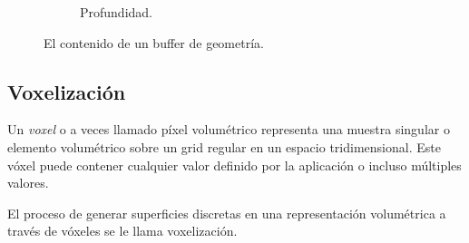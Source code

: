\begin{figure}[H]
\begin{subfigure}[t]{0.32\textwidth}
		\caption*{Profundidad.}
	\end{subfigure}%
	\caption{El contenido de un buffer de geometría.}
	\label{fig:gbuffer}
\end{figure}

\subsection{Voxelización}
\label{sec:voxelization}
Un \emph{voxel} o a veces llamado píxel volumétrico representa una muestra singular o elemento volumétrico sobre un grid regular en un espacio tridimensional. Este vóxel puede contener cualquier valor definido por la aplicación o incluso múltiples valores. 

El proceso de generar superficies discretas en una representación volumétrica a través de vóxeles se le llama voxelización.

